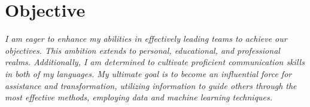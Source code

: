 

\section{Objective}
\justify
\textit{I am eager to enhance my abilities in effectively leading teams to achieve our objectives. This ambition extends to personal, educational, and professional realms. Additionally, I am determined to cultivate proficient communication skills in both of my languages. My ultimate goal is to become an influential force for assistance and transformation, utilizing information to guide others through the most effective methods, employing data and machine learning techniques.}

